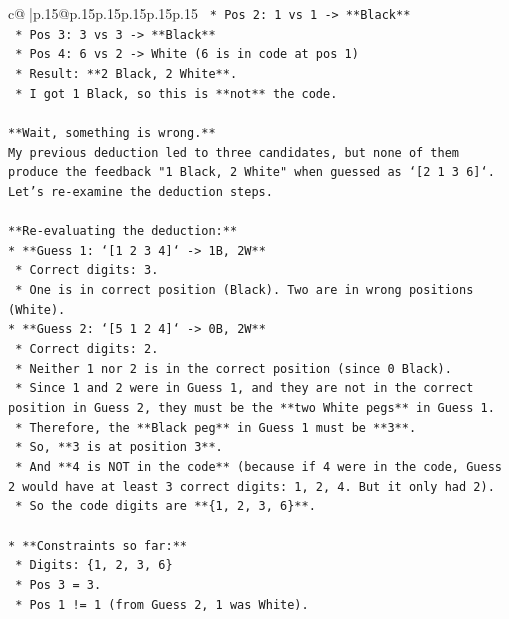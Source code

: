 \documentclass{article}
\begin{document}
{\begin{supertabular}{c@{$\;$}|p{.15\linewidth}@{}p{.15\linewidth}p{.15\linewidth}p{.15\linewidth}p{.15\linewidth}p{.15\linewidth}}
{{{\texttt{    *   Pos 2: 1 vs 1 {-}> **Black**} \\
\texttt{    *   Pos 3: 3 vs 3 {-}> **Black**} \\
\texttt{    *   Pos 4: 6 vs 2 {-}> White (6 is in code at pos 1)} \\
\texttt{    *   Result: **2 Black, 2 White**.} \\
\texttt{    *   I got 1 Black, so this is **not** the code.} \\
\\ 
\texttt{**Wait, something is wrong.**} \\
\texttt{My previous deduction led to three candidates, but none of them produce the feedback "1 Black, 2 White" when guessed as `{[}2 1 3 6{]}`.} \\
\texttt{Let's re{-}examine the deduction steps.} \\
\\ 
\texttt{**Re{-}evaluating the deduction:**} \\
\texttt{*   **Guess 1: `{[}1 2 3 4{]}` {-}> 1B, 2W**} \\
\texttt{    *   Correct digits: 3.} \\
\texttt{    *   One is in correct position (Black). Two are in wrong positions (White).} \\
\texttt{*   **Guess 2: `{[}5 1 2 4{]}` {-}> 0B, 2W**} \\
\texttt{    *   Correct digits: 2.} \\
\texttt{    *   Neither 1 nor 2 is in the correct position (since 0 Black).} \\
\texttt{    *   Since 1 and 2 were in Guess 1, and they are not in the correct position in Guess 2, they must be the **two White pegs** in Guess 1.} \\
\texttt{    *   Therefore, the **Black peg** in Guess 1 must be **3**.} \\
\texttt{    *   So, **3 is at position 3**.} \\
\texttt{    *   And **4 is NOT in the code** (because if 4 were in the code, Guess 2 would have at least 3 correct digits: 1, 2, 4. But it only had 2).} \\
\texttt{    *   So the code digits are **\{1, 2, 3, 6\}**.} \\
\\ 
\texttt{*   **Constraints so far:**} \\
\texttt{    *   Digits: \{1, 2, 3, 6\}} \\
\texttt{    *   Pos 3 = 3.} \\
\texttt{    *   Pos 1 != 1 (from Guess 2, 1 was White).} \\
}}}
\end{supertabular}}
\end{document}
